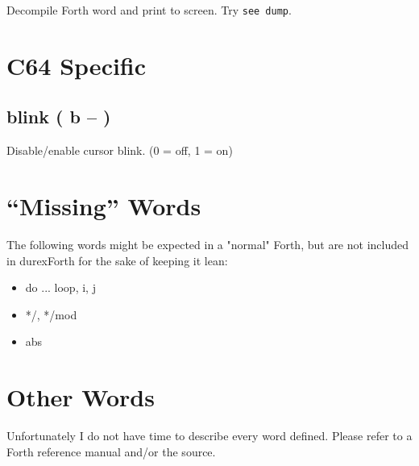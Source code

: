 Decompile Forth word and print to screen. Try \texttt{see dump}.

\section{C64 Specific}

\subsection{blink ( b -- )}

Disable/enable cursor blink. (0 = off, 1 = on)


\section{``Missing'' Words}

The following words might be expected in a "normal" Forth, but are not included in durexForth for the sake of keeping it lean:

\begin{itemize}
\item do ... loop, i, j
\item */, */mod
\item abs
\end{itemize}


\section{Other Words}

Unfortunately I do not have time to describe every word defined. Please refer to a Forth reference manual and/or the source.
